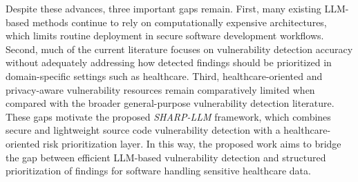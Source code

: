 \documentclass[conference]{IEEEtran}
\begin{document}
Despite these advances, three important gaps remain. First, many existing LLM-based methods continue to rely on computationally expensive architectures, which limits routine deployment in secure software development workflows. Second, much of the current literature focuses on vulnerability detection accuracy without adequately addressing how detected findings should be prioritized in domain-specific settings such as healthcare. Third, healthcare-oriented and privacy-aware vulnerability resources remain comparatively limited when compared with the broader general-purpose vulnerability detection literature. These gaps motivate the proposed \textit{SHARP-LLM} framework, which combines secure and lightweight source code vulnerability detection with a healthcare-oriented risk prioritization layer. In this way, the proposed work aims to bridge the gap between efficient LLM-based vulnerability detection and structured prioritization of findings for software handling sensitive healthcare data.
\end{document}
